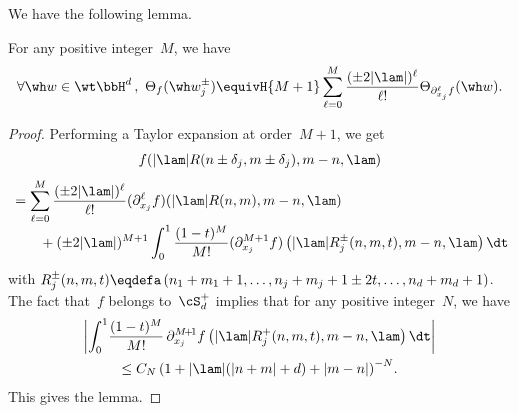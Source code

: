 We have the following lemma.

\begin{lemm}\label{TaylorHtilde}
For any positive integer~$M$, we have
\[
\forall \wh w \in \wt \bbH^d\,,\ \Theta_f (\wh w_j^\pm) \equivH {M+1}
\sum_{\ell=0} ^{M} \frac { (\pm2|\lam|)^\ell } {\ell!} \Theta _{\partial_{x_j}^\ell f}(\wh w).
\]
\end{lemm}

\begin{proof}
Performing a Taylor expansion at order~$M+1$, we get
\begin{multline*}
f (|\lam| R(n\pm \delta_j, m\pm \delta_j),m-n,\lam)\\[0.35em]
\begin{aligned}
&=\sum_{\ell=0} ^{M} \frac {(\pm2|\lam|)^\ell } {\ell!} (\partial_{x_j}^\ell f)(|\lam|R(n,m),m-n,\lam)\\[-0.25em]
&\qquad + (\pm2|\lam|)^{M+1} \int_0^1 \frac {(1-t)^{M}} {M!} (\partial_{x_j}^{M+1} f)\left(|\lam|R^\pm_j(n,m,t),m-n,\lam\right)\dt
\end{aligned}
\end{multline*}
with $R^\pm_j (n,m,t) \eqdefa \left (n_1+m_1+1,\dots, n_j+m_j+1\pm 2t, \dots, n_d+m_d+1\right)$. The fact that~$f$ belongs to~$\cS_d^+$ implies that for any positive integer~$N$, we have
\begin{multline*}
\left | \int_0^1 \! \frac {(1-t)^{M}} {M!}\,\partial_{x_j}^{M\!+\!1} f\left(|\lam|R^+_j(n,m,t),m-n,\lam\right)\dt \right|\\
\leq C_N\left(1+|\lam|(|n+m|+d)+|m-n|\right)^{-N}\!.
\end{multline*}
This gives the lemma.
\end{proof}

